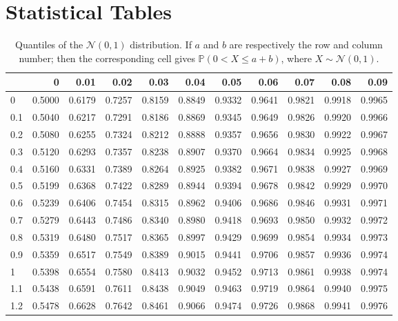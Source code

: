 \documentclass[
  12pt,
]{book}
\theoremstyle{definition}
\theoremstyle{definition}
\theoremstyle{definition}
\theoremstyle{definition}
\theoremstyle{remark}
\begin{document}
\section{Statistical Tables}\label{statistical-tables}

\begin{table}

\caption{\label{tab:Normal}Quantiles of the $\mathcal{N}(0,1)$ distribution. If $a$ and $b$ are respectively the row and column number; then the corresponding cell gives $\mathbb{P}(0<X\le a+b)$, where $X \sim \mathcal{N}(0,1)$.}
\centering
\begin{tabular}[t]{l|r|r|r|r|r|r|r|r|r|r}
\hline
  & 0 & 0.01 & 0.02 & 0.03 & 0.04 & 0.05 & 0.06 & 0.07 & 0.08 & 0.09\\
\hline
0 & 0.5000 & 0.6179 & 0.7257 & 0.8159 & 0.8849 & 0.9332 & 0.9641 & 0.9821 & 0.9918 & 0.9965\\
\hline
0.1 & 0.5040 & 0.6217 & 0.7291 & 0.8186 & 0.8869 & 0.9345 & 0.9649 & 0.9826 & 0.9920 & 0.9966\\
\hline
0.2 & 0.5080 & 0.6255 & 0.7324 & 0.8212 & 0.8888 & 0.9357 & 0.9656 & 0.9830 & 0.9922 & 0.9967\\
\hline
0.3 & 0.5120 & 0.6293 & 0.7357 & 0.8238 & 0.8907 & 0.9370 & 0.9664 & 0.9834 & 0.9925 & 0.9968\\
\hline
0.4 & 0.5160 & 0.6331 & 0.7389 & 0.8264 & 0.8925 & 0.9382 & 0.9671 & 0.9838 & 0.9927 & 0.9969\\
\hline
0.5 & 0.5199 & 0.6368 & 0.7422 & 0.8289 & 0.8944 & 0.9394 & 0.9678 & 0.9842 & 0.9929 & 0.9970\\
\hline
0.6 & 0.5239 & 0.6406 & 0.7454 & 0.8315 & 0.8962 & 0.9406 & 0.9686 & 0.9846 & 0.9931 & 0.9971\\
\hline
0.7 & 0.5279 & 0.6443 & 0.7486 & 0.8340 & 0.8980 & 0.9418 & 0.9693 & 0.9850 & 0.9932 & 0.9972\\
\hline
0.8 & 0.5319 & 0.6480 & 0.7517 & 0.8365 & 0.8997 & 0.9429 & 0.9699 & 0.9854 & 0.9934 & 0.9973\\
\hline
0.9 & 0.5359 & 0.6517 & 0.7549 & 0.8389 & 0.9015 & 0.9441 & 0.9706 & 0.9857 & 0.9936 & 0.9974\\
\hline
1 & 0.5398 & 0.6554 & 0.7580 & 0.8413 & 0.9032 & 0.9452 & 0.9713 & 0.9861 & 0.9938 & 0.9974\\
\hline
1.1 & 0.5438 & 0.6591 & 0.7611 & 0.8438 & 0.9049 & 0.9463 & 0.9719 & 0.9864 & 0.9940 & 0.9975\\
\hline
1.2 & 0.5478 & 0.6628 & 0.7642 & 0.8461 & 0.9066 & 0.9474 & 0.9726 & 0.9868 & 0.9941 & 0.9976\\

\end{tabular}
\end{table}
\end{document}
